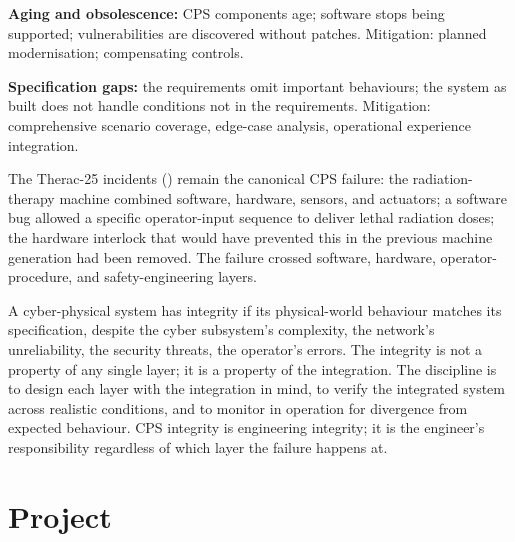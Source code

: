 \textbf{Aging and obsolescence:} CPS components age; software stops being supported; vulnerabilities are discovered without patches. Mitigation: planned modernisation; compensating controls.

\textbf{Specification gaps:} the requirements omit important behaviours; the system as built does not handle conditions not in the requirements. Mitigation: comprehensive scenario coverage, edge-case analysis, operational experience integration.

The Therac-25 incidents (\cite{paper:leveson-turner1993}) remain the canonical CPS failure: the radiation-therapy machine combined software, hardware, sensors, and actuators; a software bug allowed a specific operator-input sequence to deliver lethal radiation doses; the hardware interlock that would have prevented this in the previous machine generation had been removed. The failure crossed software, hardware, operator-procedure, and safety-engineering layers.

\begin{principle}
A cyber-physical system has integrity if its physical-world behaviour matches its specification, despite the cyber subsystem's complexity, the network's unreliability, the security threats, the operator's errors. The integrity is not a property of any single layer; it is a property of the integration. The discipline is to design each layer with the integration in mind, to verify the integrated system across realistic conditions, and to monitor in operation for divergence from expected behaviour. CPS integrity is engineering integrity; it is the engineer's responsibility regardless of which layer the failure happens at.
\end{principle}

\section{Project}

